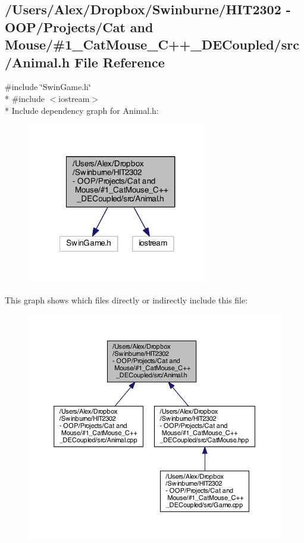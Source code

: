 \subsection{/\-Users/\-Alex/\-Dropbox/\-Swinburne/\-H\-I\-T2302 -\/ O\-O\-P/\-Projects/\-Cat and Mouse/\#1\-\_\-\-Cat\-Mouse\-\_\-\-C++\-\_\-\-D\-E\-Coupled/src/\-Animal.h File Reference}
\label{_animal_8h}
{\ttfamily \#include \char`\"{}Swin\-Game.\-h\char`\"{}}\\*
{\ttfamily \#include $<$iostream$>$}\\*
Include dependency graph for Animal.\-h\-:
\nopagebreak
\begin{figure}[H]
\begin{center}
\leavevmode
\includegraphics[width=224pt]{_animal_8h__incl}
\end{center}
\end{figure}
This graph shows which files directly or indirectly include this file\-:
\nopagebreak
\begin{figure}[H]
\begin{center}
\leavevmode
\includegraphics[width=350pt]{_animal_8h__dep__incl}
\end{center}
\end{figure}
